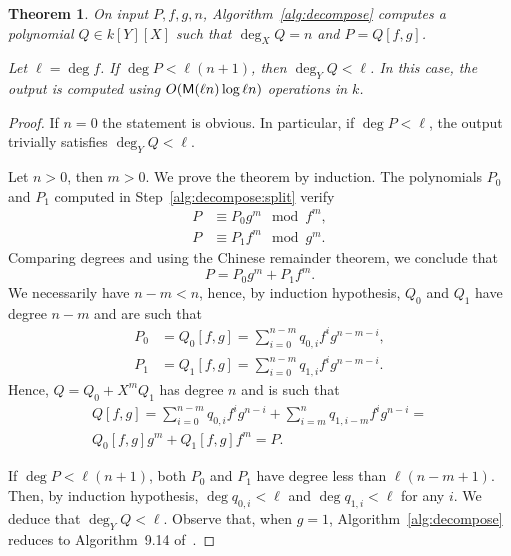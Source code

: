 \documentclass{sig-alternate}
\newtheorem{theorem}{Theorem}
\begin{document}
\begin{theorem}
  On input $P,f,g,n$, Algorithm~\ref{alg:decompose} computes a
  polynomial $Q\in k[Y][X]$ such that $\deg_X Q=n$ and $P=Q[f,g]$.

  Let $\ell=\deg f$. If $\deg P < \ell(n+1)$, then $\deg_Y Q<\ell$. In
  this case, the output is computed using $O(\mathsf{M}(\ell n)\log \ell
  n)$ operations in $k$.
\end{theorem}
\begin{proof}
  If $n=0$ the statement is obvious. In particular, if $\deg P <
  \ell$, the output trivially satisfies $\deg_YQ<\ell$.

  Let $n>0$, then $m>0$. We prove the theorem by induction. The
  polynomials $P_0$ and $P_1$ computed in
  Step~\ref{alg:decompose:split} verify
  \begin{equation}
    \begin{aligned}
      P &\equiv P_0g^m \mod f^m,\\
      P &\equiv P_1f^m \mod g^m.
    \end{aligned}
  \end{equation}
  Comparing degrees and using the Chinese remainder theorem, we
  conclude that
  \begin{equation}
    P = P_0g^m + P_1f^m.
  \end{equation}
  We necessarily have $n-m<n$, hence, by induction hypothesis, $Q_0$
  and $Q_1$ have degree $n-m$ and are such that
  \begin{equation}
    \begin{aligned}
      P_0 &= Q_0[f,g] = \sum_{i=0}^{n-m} q_{0,i}f^ig^{n-m-i},\\
      P_1 &= Q_1[f,g] = \sum_{i=0}^{n-m} q_{1,i}f^ig^{n-m-i}.
    \end{aligned}
  \end{equation}
  Hence, $Q=Q_0+X^mQ_1$ has degree $n$ and is such that
  \begin{multline}
    Q[f,g] = \sum_{i=0}^{n-m}q_{0,i}f^ig^{n-i} + 
    \sum_{i=m}^nq_{1,i-m}f^ig^{n-i} =\\
    Q_0[f,g]g^m + Q_1[f,g]f^m = P.
  \end{multline}

  If $\deg P < \ell (n+1)$, both $P_0$ and $P_1$ have degree less than
  $\ell(n-m+1)$. Then, by induction hypothesis, $\deg q_{0,i}<\ell$
  and $\deg q_{1,i}<\ell$ for any $i$. We deduce that
  $\deg_YQ<\ell$. Observe that, when $g=1$,
  Algorithm~\ref{alg:decompose} reduces to Algorithm~9.14
  of~\cite{vzGG}.


\end{proof}
\end{document}
